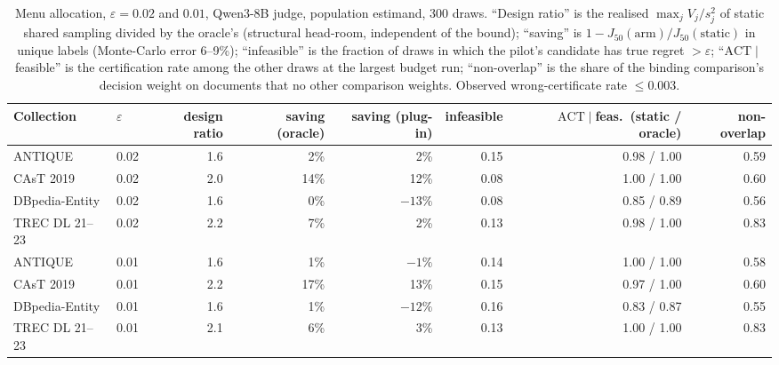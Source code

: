 \documentclass{article}
\newcommand{\eps}{\varepsilon}
\newcommand{\ACT}{\mathrm{ACT}}
\newcommand{\Jfifty}{J_{50}}
\begin{document}
\begin{table}[h]\centering\scriptsize\setlength{\tabcolsep}{3pt}
\caption{Menu allocation, $\eps=0.02$ and $0.01$, Qwen3-8B judge, population estimand, 300 draws. ``Design ratio'' is the realised $\max_jV_j/s_j^2$ of static shared sampling divided by the oracle's (structural head-room, independent of the bound); ``saving'' is $1-\Jfifty(\text{arm})/\Jfifty(\text{static})$ in unique labels (Monte-Carlo error 6--9\%); ``infeasible'' is the fraction of draws in which the pilot's candidate has true regret $>\eps$; ``$\ACT\mid$feasible'' is the certification rate among the other draws at the largest budget run; ``non-overlap'' is the share of the binding comparison's decision weight on documents that no other comparison weights. Observed wrong-certificate rate $\le0.003$.}\label{tab:menu}
\begin{tabular}{llrrrrrr}\toprule
Collection & $\eps$ & design ratio & saving (oracle) & saving (plug-in) & infeasible & $\ACT\mid$feas.\ (static / oracle) & non-overlap\\\midrule
ANTIQUE & 0.02 & 1.6 & 2\% & 2\% & 0.15 & 0.98 / 1.00 & 0.59\\
CAsT 2019 & 0.02 & 2.0 & 14\% & 12\% & 0.08 & 1.00 / 1.00 & 0.60\\
DBpedia-Entity & 0.02 & 1.6 & 0\% & $-13\%$ & 0.08 & 0.85 / 0.89 & 0.56\\
TREC DL 21--23 & 0.02 & 2.2 & 7\% & 2\% & 0.13 & 0.98 / 1.00 & 0.83\\\midrule
ANTIQUE & 0.01 & 1.6 & 1\% & $-1\%$ & 0.14 & 1.00 / 1.00 & 0.58\\
CAsT 2019 & 0.01 & 2.2 & 17\% & 13\% & 0.15 & 0.97 / 1.00 & 0.60\\
DBpedia-Entity & 0.01 & 1.6 & 1\% & $-12\%$ & 0.16 & 0.83 / 0.87 & 0.55\\
TREC DL 21--23 & 0.01 & 2.1 & 6\% & 3\% & 0.13 & 1.00 / 1.00 & 0.83\\\bottomrule
\end{tabular}
\end{table}
\end{document}
